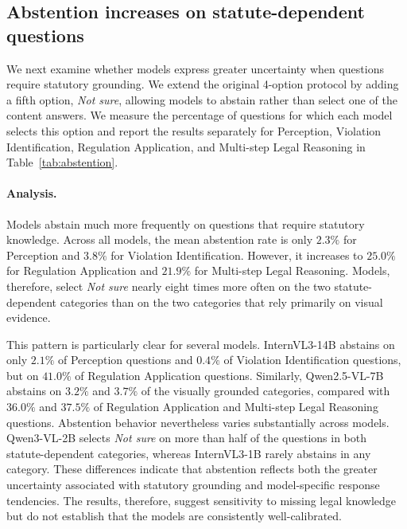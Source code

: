 \subsection{Abstention increases on statute-dependent questions}
\label{sec:abstain}
We next examine whether models express greater uncertainty when questions require statutory grounding. We extend the original 4-option protocol by adding a fifth option, \textit{Not sure}, allowing models to abstain rather than select one of the content answers. We measure the percentage of questions for which each model selects this option and report the results separately for Perception, Violation Identification, Regulation Application, and Multi-step Legal Reasoning in Table~\ref{tab:abstention}.


\paragraph{Analysis.}
Models abstain much more frequently on questions that require statutory knowledge. Across all models, the mean abstention rate is only $2.3\%$ for Perception and $3.8\%$ for Violation Identification. However, it increases to $25.0\%$ for Regulation Application and $21.9\%$ for Multi-step Legal Reasoning. Models, therefore, select \textit{Not sure} nearly eight times more often on the two statute-dependent categories than on the two categories that rely primarily on visual evidence.

This pattern is particularly clear for several models. InternVL3-14B abstains on only $2.1\%$ of Perception questions and $0.4\%$ of Violation Identification questions, but on $41.0\%$ of Regulation Application questions. Similarly, Qwen2.5-VL-7B abstains on $3.2\%$ and $3.7\%$ of the visually grounded categories, compared with $36.0\%$ and $37.5\%$ of Regulation Application and Multi-step Legal Reasoning questions. Abstention behavior nevertheless varies substantially across models. Qwen3-VL-2B selects \textit{Not sure} on more than half of the questions in both statute-dependent categories, whereas InternVL3-1B rarely abstains in any category. These differences indicate that abstention reflects both the greater uncertainty associated with statutory grounding and model-specific response tendencies. The results, therefore, suggest sensitivity to missing legal knowledge but do not establish that the models are consistently well-calibrated.


